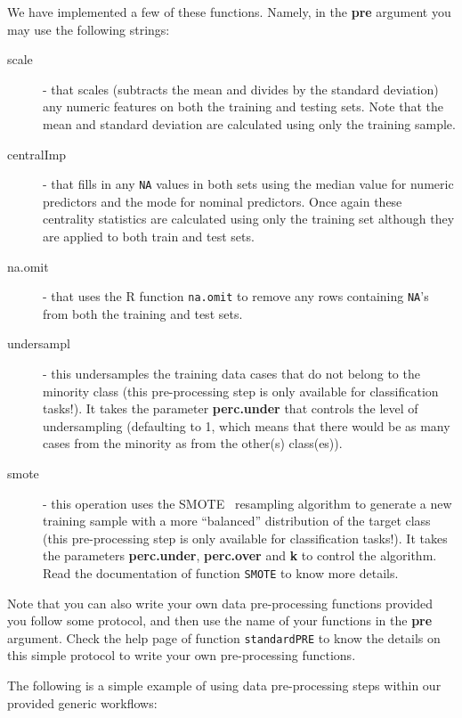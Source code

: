 \documentclass[10pt,a4paper]{article}\usepackage[]{graphicx}\usepackage[]{color}
\begin{document}
We have implemented a few of these functions. Namely, in the \textbf{pre} argument you may use the following strings:

\begin{description}
\item[scale] - that scales (subtracts the mean and divides by the standard
  deviation) any numeric features on both the training and testing
  sets. Note that the mean and standard deviation are calculated using
  only the training sample.

\item[centralImp] - that fills in any \texttt{NA} values in both sets using
  the median value for numeric predictors and the mode for nominal
  predictors. Once again these centrality statistics are calculated
  using only the training set although they are applied to both train
  and test sets.

\item[na.omit] - that uses the R function \texttt{na.omit} to remove
  any rows containing \texttt{NA}'s  from both the training and test sets.

\item[undersampl] - this undersamples the training data cases that do not
  belong to the minority class (this pre-processing step is only
  available for classification tasks!). It takes the parameter
  \textbf{perc.under} that controls the level of undersampling
  (defaulting to 1, which means that there would be as many cases from
  the minority as from the other(s) class(es)).

\item[smote] - this operation uses the SMOTE~\cite{CBOK02}
  resampling algorithm to  generate a new training sample with a more
  ``balanced'' distribution of the target class (this pre-processing step
  is only available for classification tasks!). It takes the parameters
  \textbf{perc.under},  \textbf{perc.over} and \textbf{k} to control the
  algorithm. Read the  documentation of function \texttt{SMOTE} to
  know more details. 
\end{description}

Note that you can also write your own data pre-processing functions
provided you follow some protocol, and then use the name of your
functions in the \textbf{pre} argument. Check the help page of
function \texttt{standardPRE} to know the details on this simple
protocol to write your own pre-processing functions.

The following is a simple example of using data pre-processing steps within our provided generic workflows:
\end{document}
